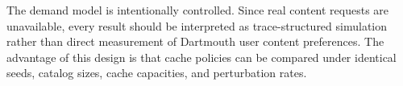 The demand model is intentionally controlled. Since real content requests are unavailable, every result should be interpreted as trace-structured simulation rather than direct measurement of Dartmouth user content preferences. The advantage of this design is that cache policies can be compared under identical seeds, catalog sizes, cache capacities, and perturbation rates.
